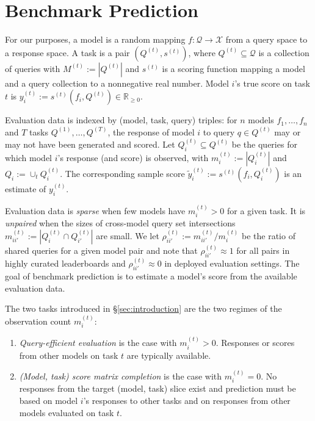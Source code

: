 \documentclass{article}
\theoremstyle{definition}
\theoremstyle{plain}
\begin{document}
\section{Benchmark Prediction}
\label{sec:setting}
For our purposes, a model is a random mapping
$f:\mathcal{Q}\to\mathcal{X}$ from a query space to a response space.
A task is a pair $(Q^{(t)}, s^{(t)})$, where $Q^{(t)}\subseteq\mathcal{Q}$ is a
collection of queries with $M^{(t)}:=|Q^{(t)}|$ and $s^{(t)}$ is a scoring function
mapping a model and a query collection to a nonnegative real number. 
Model $i$'s true score on task
$t$ is $y_i^{(t)}:=s^{(t)}(f_{i},Q^{(t)}) \in \mathbb{R}_{\ge 0}$.

Evaluation data is indexed by (model, task, query) triples: for $n$ models
$f_1,\dots,f_n$ and $T$ tasks $Q^{(1)},\dots,Q^{(T)}$, the response of model $i$ to
query $q\in Q^{(t)}$ may or may not have been generated and scored.
Let $Q_{i}^{(t)}\subseteq Q^{(t)}$ be the queries for which model $i$'s response (and score) is
observed, with $m_{i}^{(t)}:=|Q^{(t)}_{i}|$ and $Q_i:=\cup_{t}Q_i^{(t)}$.
The corresponding sample score
$\tilde{y}_{i}^{(t)}:=s^{(t)}(f_{i},Q_{i}^{(t)})$ is an estimate of
$y_{i}^{(t)}$.

Evaluation data is \emph{sparse} when few models have
$m_{i}^{(t)}>0$ for a given task. It is \emph{unpaired} when the sizes of cross-model query set intersections 
$m_{ii'}^{(t)}:=|Q_{i}^{(t)}\cap Q_{i'}^{(t)}|$ are small. We let
$\rho_{ii'}^{(t)}:=m_{ii'}^{(t)}/m_{i}^{(t)}$ be the ratio of shared queries for a
given model pair and note that $\rho_{ii'}^{(t)}\approx1$ for all pairs in highly curated
leaderboards and $\rho_{ii'}^{(t)}\approx0$ in deployed evaluation settings.
The goal of benchmark prediction is to estimate a model's score from the available
evaluation data.

The two tasks introduced in \S\ref{sec:introduction} are the two regimes of the
observation count $m_i^{(t)}$:
\begin{enumerate}[wide, labelwidth=1pt, labelindent=12pt]
\setlength{\itemsep}{1pt}\setlength{\parskip}{0pt}
\item \emph{Query-efficient evaluation} is the case
with $m_{i}^{(t)}>0$. Responses or scores from other models on task $t$ are
typically available.
\item \emph{(Model, task) score matrix completion} is the case with $m_{i}^{(t)}=0$.
No responses from the target (model, task) slice exist and prediction
must be based on model $i$'s responses to other tasks and on responses from
other models evaluated on task $t$.
\end{enumerate}
\end{document}
